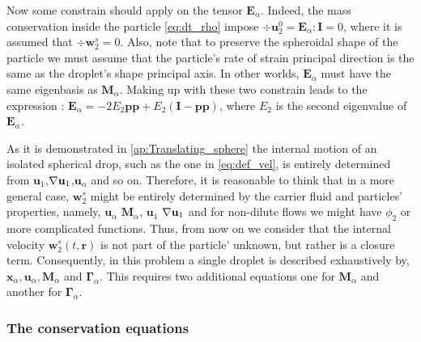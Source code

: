 Now some constrain should apply on the tensor $\textbf{E}_\alpha$.
Indeed, the mass conservation inside the particle \ref{eq:dt_rho} impose $\div \textbf{u}_2^0 = \textbf{E}_\alpha : \textbf{I}= 0$, where it is assumed that $\div \textbf{w}_2^s =0$. 
Also, note that to preserve the spheroidal shape of the particle we must assume that the particle's rate of strain principal direction is the same as the droplet's shape principal axis. 
In other worlds, $\textbf{E}_\alpha$ must have the same eigenbasis as $\textbf{M}_\alpha$. 
Making up with these two constrain leads to the expression : $\textbf{E}_\alpha = -2 E_2 \textbf{pp} + E_2 (\textbf{I}- \textbf{pp})$, where $E_2$ is the second eigenvalue of $\textbf{E}_\alpha$. 


As it is demonstrated in \ref{ap:Translating_sphere} the internal motion of an isolated spherical drop, such as the one in \ref{eq:def_vel}, is entirely determined  from $\textbf{u}_1$,$\mathbf{\nabla}\textbf{u}_1$,$\textbf{u}_\alpha$ and so on. 
Therefore, it is reasonable to think that in a more general case, $\textbf{w}_2^s$ might be entirely determined by the carrier fluid and particles' properties, namely, $\textbf{u}_\alpha$ $\textbf{M}_\alpha$, $\textbf{u}_1$ $\mathbf{\nabla}\textbf{u}_1$ and for non-dilute flows we might have $\phi_2$ or more complicated functions. 
Thus, from now on we consider that the internal velocity $\textbf{w}^{s}_2(t,\textbf{r})$ is not part of the particle' unknown, but rather is a closure term. 
Consequently, in this problem a single droplet is described exhaustively by, $\textbf{x}_\alpha, \textbf{u}_\alpha, \textbf{M}_\alpha$ and $\bm\Gamma_\alpha$. 
This requires two additional equations one for $\textbf{M}_\alpha$ and another for $\bm\Gamma_\alpha$. 

\subsubsection*{The conservation equations}

